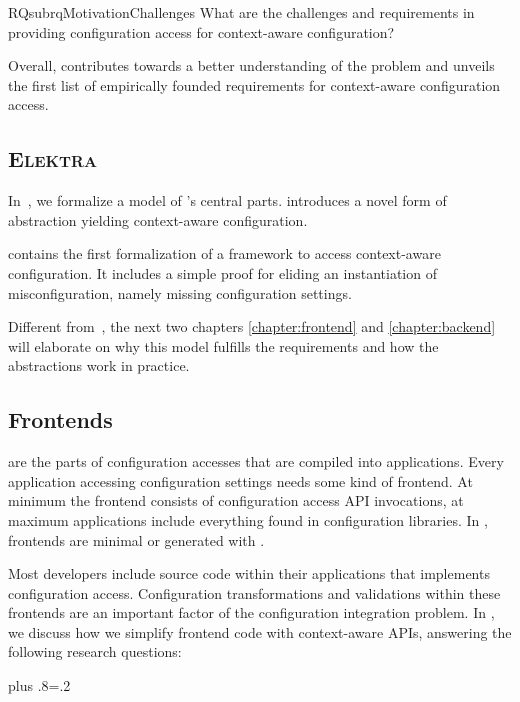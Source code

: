 \begin{restatable}{RQsub}{rqMotivationChallenges}
What are the challenges and requirements in providing configuration access for context-aware configuration?%
\label{rq:motivation-challenges}
\end{restatable}

\begin{contribution}
Overall,  contributes towards a better understanding of the problem and unveils the first list of empirically founded requirements for context-aware configuration access.
\end{contribution}


\subsection{\textsc{Elektra}}

\addtocounter{RQ}{1}

In~, we formalize a model of \elektra{}'s central parts.
\elektra{} introduces a novel form of abstraction yielding context-aware configuration.

\begin{contribution}
 contains the first formalization of a framework to access context-aware configuration.
It includes a simple proof for eliding an instantiation of misconfiguration, namely missing configuration settings.
\end{contribution}

Different from~, the next two chapters \ref{chapter:frontend} and \ref{chapter:backend} will elaborate on why this model fulfills the requirements and how the abstractions work in practice.


\subsection{Frontends}

 are the parts of configuration accesses that are compiled into applications.
Every application accessing configuration settings needs some kind of frontend.
At minimum the frontend consists of configuration access API invocations, at maximum applications include everything found in configuration libraries.
In \elektra{}, frontends are minimal or generated with .

Most developers include source code within their applications that implements configuration access.
Configuration transformations and validations within these frontends are an important factor of the configuration integration problem.
In , we discuss how we simplify frontend code with context-aware APIs, answering the following research questions:%
{\parfillskip=0pt plus .8\textwidth \emergencystretch=.2\textwidth \par}


